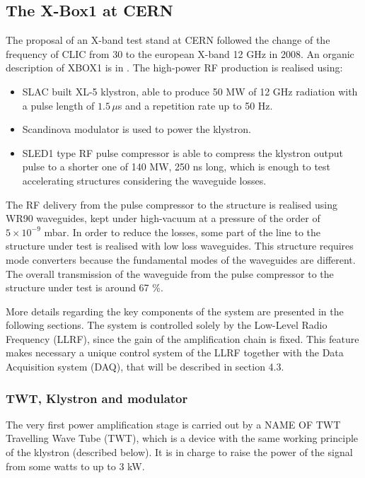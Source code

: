 \subsection[The X-Box1 at CERN]{The X-Box1 at CERN}

The proposal of an X-band test stand at CERN followed the change of the frequency of CLIC from 30 to the european X-band 12 GHz in 2008. An organic description of XBOX1 is in \cite{Woolley:2015,Kovermann:1459879}. The high-power RF production is realised using:
\begin{itemize}
\item SLAC built XL-5 klystron, able to produce 50 MW of 12 GHz radiation with a pulse length of $1.5\, \mu$s and a repetition rate up to 50 Hz.
\item Scandinova modulator is used to power the klystron.
\item SLED1 type RF pulse compressor is able to compress the klystron output pulse to a shorter one of 140 MW, 250 ns long, which is enough to test accelerating structures considering the waveguide losses.
\end{itemize}

The RF delivery from the pulse compressor to the structure is realised using WR90 waveguides, kept under high-vacuum at a pressure of the order of\\ $5\times10^{-9}$ mbar. In order to reduce the losses, some part of the line to the structure under test is realised with low loss waveguides. This structure requires mode converters because the fundamental modes of the waveguides are different. The overall transmission of the waveguide from the pulse compressor to the structure under test is around 67 \%.

More details regarding the key components of the system are presented in the following sections. The system is controlled solely by the Low-Level Radio Frequency (LLRF), since the gain of the amplification chain is fixed. This feature makes necessary a unique control system of the LLRF together with the Data Acquisition system (DAQ), that will be described in section 4.3.


\subsubsection{TWT, Klystron and modulator}


The very first power amplification stage is carried out by a NAME OF TWT Travelling Wave Tube (TWT), which is a device with the same working principle of the klystron (described below). It is in charge to raise the power of the signal from some watts to up to 3 kW.


